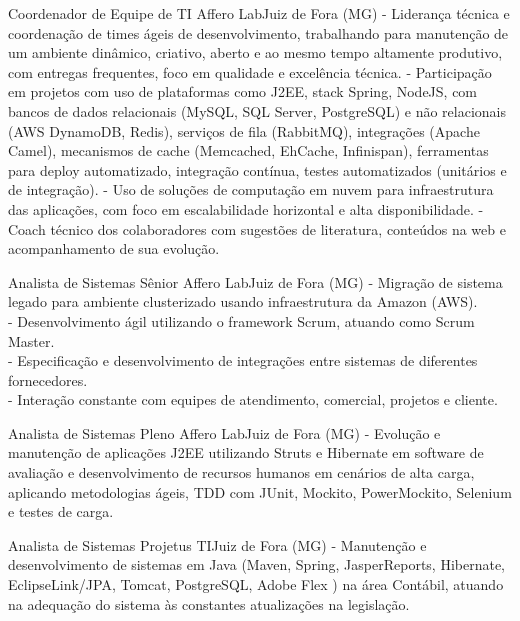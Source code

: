 \documentclass[12pt, a4paper, sans]{moderncv}
\begin{document}
{Coordenador de Equipe de TI}
{Affero Lab}{Juiz de Fora (MG)}{}
{
- Liderança técnica e coordenação de times ágeis de desenvolvimento, trabalhando para manutenção de um ambiente dinâmico, criativo, aberto e ao mesmo tempo altamente produtivo, com entregas frequentes, foco em qualidade e excelência técnica.\newline{}
- Participação em projetos com uso de plataformas como J2EE, stack Spring, NodeJS, com bancos de dados relacionais (MySQL, SQL Server, PostgreSQL) e não relacionais (AWS DynamoDB, Redis), serviços de fila (RabbitMQ), integrações (Apache Camel), mecanismos de cache (Memcached, EhCache, Infinispan), ferramentas para deploy automatizado, integração contínua, testes automatizados (unitários e de integração).\newline{}
- Uso de soluções de computação em nuvem para infraestrutura das aplicações, com foco em escalabilidade horizontal e alta disponibilidade.\newline{}
- Coach técnico dos colaboradores com sugestões de literatura, conteúdos na web e acompanhamento de sua evolução.\newline{}}

{Analista de Sistemas Sênior}
{Affero Lab}{Juiz de Fora (MG)}{}
{- Migração de sistema legado para ambiente clusterizado usando infraestrutura da Amazon (AWS).\\
- Desenvolvimento ágil utilizando o framework Scrum, atuando como Scrum Master.\\
- Especificação e desenvolvimento de integrações entre sistemas de diferentes fornecedores.\\
- Interação constante com equipes de atendimento, comercial, projetos e cliente.}

{Analista de Sistemas Pleno}
{Affero Lab}{Juiz de Fora (MG)}{}
{- Evolução e manutenção de aplicações J2EE utilizando Struts e Hibernate em software de avaliação e desenvolvimento de recursos humanos em cenários de alta carga, aplicando metodologias ágeis, TDD com JUnit, Mockito, PowerMockito, Selenium e testes de carga.}

{Analista de Sistemas}
{Projetus TI}{Juiz de Fora (MG)}{}
{- Manutenção e desenvolvimento de sistemas em Java (Maven, Spring, JasperReports, Hibernate, EclipseLink/JPA, Tomcat, PostgreSQL, Adobe Flex ) na área Contábil, atuando na adequação do sistema às constantes atualizações na legislação.}
\end{document}

